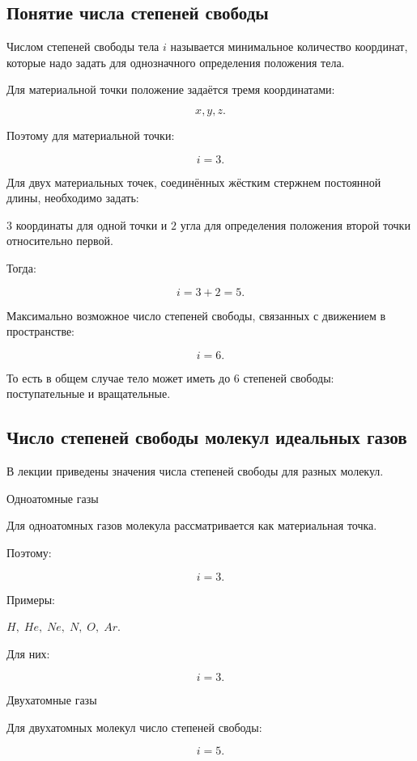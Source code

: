 \documentclass[a4paper,12pt]{article}
\begin{document}
\subsection*{Понятие числа степеней свободы}

\begin{definitionbox}
Числом степеней свободы тела $i$ называется минимальное количество координат, которые надо задать для однозначного определения положения тела.
\end{definitionbox}

Для материальной точки положение задаётся тремя координатами:

\[
x,y,z.
\]

Поэтому для материальной точки:

\[
i=3.
\]

Для двух материальных точек, соединённых жёстким стержнем постоянной длины, необходимо задать:

$3$ координаты для одной точки и $2$ угла для определения положения второй точки относительно первой.

Тогда:

\[
i=3+2=5.
\]

Максимально возможное число степеней свободы, связанных с движением в пространстве:

\[
i=6.
\]

То есть в общем случае тело может иметь до $6$ степеней свободы: поступательные и вращательные.

\subsection*{Число степеней свободы молекул идеальных газов}

В лекции приведены значения числа степеней свободы для разных молекул.

Одноатомные газы

Для одноатомных газов молекула рассматривается как материальная точка.

Поэтому:

\[
i=3.
\]

Примеры:

$H,\; He,\; Ne,\; N,\; O,\; Ar$.

Для них:

\[
i=3.
\]

Двухатомные газы

Для двухатомных молекул число степеней свободы:

\[
i=5.
\]
\end{document}
